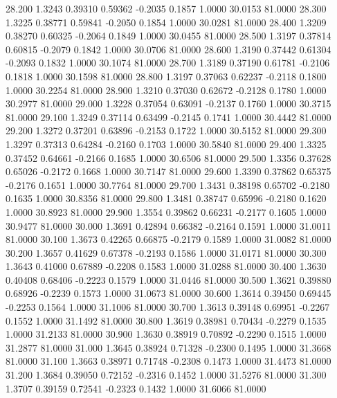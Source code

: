   28.200   1.3243   0.39310   0.59362  -0.2035   0.1857   1.0000  30.0153  81.0000
  28.300   1.3225   0.38771   0.59841  -0.2050   0.1854   1.0000  30.0281  81.0000
  28.400   1.3209   0.38270   0.60325  -0.2064   0.1849   1.0000  30.0455  81.0000
  28.500   1.3197   0.37814   0.60815  -0.2079   0.1842   1.0000  30.0706  81.0000
  28.600   1.3190   0.37442   0.61304  -0.2093   0.1832   1.0000  30.1074  81.0000
  28.700   1.3189   0.37190   0.61781  -0.2106   0.1818   1.0000  30.1598  81.0000
  28.800   1.3197   0.37063   0.62237  -0.2118   0.1800   1.0000  30.2254  81.0000
  28.900   1.3210   0.37030   0.62672  -0.2128   0.1780   1.0000  30.2977  81.0000
  29.000   1.3228   0.37054   0.63091  -0.2137   0.1760   1.0000  30.3715  81.0000
  29.100   1.3249   0.37114   0.63499  -0.2145   0.1741   1.0000  30.4442  81.0000
  29.200   1.3272   0.37201   0.63896  -0.2153   0.1722   1.0000  30.5152  81.0000
  29.300   1.3297   0.37313   0.64284  -0.2160   0.1703   1.0000  30.5840  81.0000
  29.400   1.3325   0.37452   0.64661  -0.2166   0.1685   1.0000  30.6506  81.0000
  29.500   1.3356   0.37628   0.65026  -0.2172   0.1668   1.0000  30.7147  81.0000
  29.600   1.3390   0.37862   0.65375  -0.2176   0.1651   1.0000  30.7764  81.0000
  29.700   1.3431   0.38198   0.65702  -0.2180   0.1635   1.0000  30.8356  81.0000
  29.800   1.3481   0.38747   0.65996  -0.2180   0.1620   1.0000  30.8923  81.0000
  29.900   1.3554   0.39862   0.66231  -0.2177   0.1605   1.0000  30.9477  81.0000
  30.000   1.3691   0.42894   0.66382  -0.2164   0.1591   1.0000  31.0011  81.0000
  30.100   1.3673   0.42265   0.66875  -0.2179   0.1589   1.0000  31.0082  81.0000
  30.200   1.3657   0.41629   0.67378  -0.2193   0.1586   1.0000  31.0171  81.0000
  30.300   1.3643   0.41000   0.67889  -0.2208   0.1583   1.0000  31.0288  81.0000
  30.400   1.3630   0.40408   0.68406  -0.2223   0.1579   1.0000  31.0446  81.0000
  30.500   1.3621   0.39880   0.68926  -0.2239   0.1573   1.0000  31.0673  81.0000
  30.600   1.3614   0.39450   0.69445  -0.2253   0.1564   1.0000  31.1006  81.0000
  30.700   1.3613   0.39148   0.69951  -0.2267   0.1552   1.0000  31.1492  81.0000
  30.800   1.3619   0.38981   0.70434  -0.2279   0.1535   1.0000  31.2133  81.0000
  30.900   1.3630   0.38919   0.70892  -0.2290   0.1515   1.0000  31.2877  81.0000
  31.000   1.3645   0.38924   0.71328  -0.2300   0.1495   1.0000  31.3668  81.0000
  31.100   1.3663   0.38971   0.71748  -0.2308   0.1473   1.0000  31.4473  81.0000
  31.200   1.3684   0.39050   0.72152  -0.2316   0.1452   1.0000  31.5276  81.0000
  31.300   1.3707   0.39159   0.72541  -0.2323   0.1432   1.0000  31.6066  81.0000
